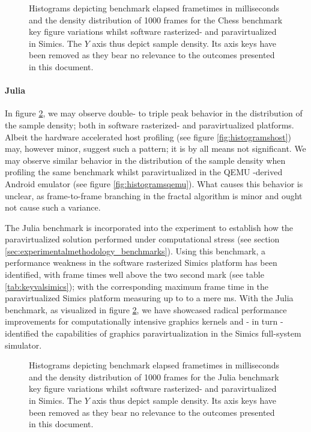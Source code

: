 \begin{figure}
  \centering
  
  \caption[Benchmark results - paravirtualized in Simics, Chess]{Histograms depicting benchmark elapsed frametimes in milliseconds and the density distribution of 1000 frames for the Chess benchmark key figure variations whilst software rasterized- and paravirtualized in Simics. The $Y$ axis thus depict sample density. Its axis keys have been removed as they bear no relevance to the outcomes presented in this document.}
  \label{fig:histogramssimicsparachess}
\end{figure}

\paragraph{Julia}
\label{par:results_julia}
In figure \ref{fig:histogramssimicsparajulia}, we may observe double- to triple peak behavior in the distribution of the sample density; both in software rasterized- and paravirtualized platforms.
Albeit the hardware accelerated host profiling (see figure \ref{fig:histogramshost}) may, however minor, suggest such a pattern; it is by all means not significant.
We may observe similar behavior in the distribution of the sample density when profiling the same benchmark whilst paravirtualized in the QEMU -derived Android emulator (see figure \ref{fig:histogramsqemu}).
What causes this behavior is unclear, as frame-to-frame branching in the fractal algorithm is minor and ought not cause such a variance.

The Julia benchmark is incorporated into the experiment to establish how the paravirtualized solution performed under computational stress (see section \ref{sec:experimentalmethodology_benchmarks}).
Using this benchmark, a performance weakness in the software rasterized Simics platform has been identified, with frame times well above the two second mark (see table \ref{tab:keyvalsimics}); with the corresponding maximum frame time in the paravirtualized Simics platform measuring up to to a mere  ms.
With the Julia benchmark, as visualized in figure \ref{fig:histogramssimicsparajulia}, we have showcased radical performance improvements for computationally intensive graphics kernels and - in turn - identified the capabilities of graphics paravirtualization in the Simics full-system simulator.

\begin{figure}
  \centering
  
  \caption[Benchmark results - paravirtualized in Simics, Julia]{Histograms depicting benchmark elapsed frametimes in milliseconds and the density distribution of 1000 frames for the Julia benchmark key figure variations whilst software rasterized- and paravirtualized in Simics. The $Y$ axis thus depict sample density. Its axis keys have been removed as they bear no relevance to the outcomes presented in this document.}
  \label{fig:histogramssimicsparajulia}
\end{figure}

